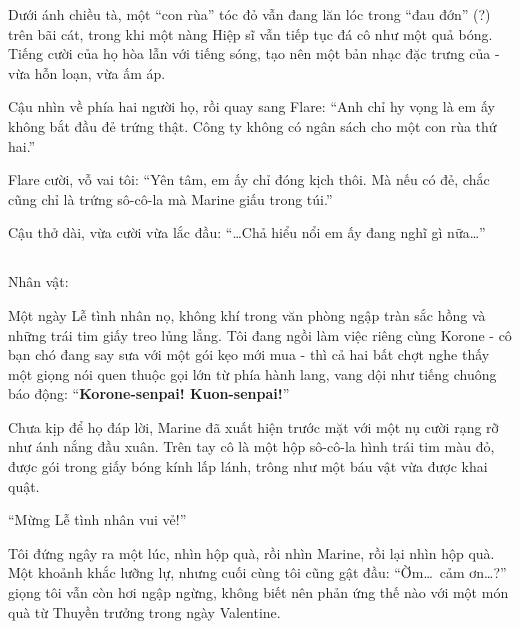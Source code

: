 \documentclass[../main.tex]{subfiles}
\begin{document}
Dưới ánh chiều tà, một ``con rùa'' tóc đỏ vẫn đang lăn lóc trong ``đau đớn'' (?) trên bãi cát, trong khi một nàng Hiệp sĩ vẫn tiếp tục đá cô như một quả bóng. Tiếng cười của họ hòa lẫn với tiếng sóng, tạo nên một bản nhạc đặc trưng của \hll - vừa hỗn loạn, vừa ấm áp.

Cậu nhìn về phía hai người họ, rồi quay sang Flare: ``Anh chỉ hy vọng là em ấy không bắt đầu đẻ trứng thật. Công ty không có ngân sách cho một con rùa thứ hai.''

Flare cười, vỗ vai tôi: ``Yên tâm, em ấy chỉ đóng kịch thôi. Mà nếu có đẻ, chắc cũng chỉ là trứng sô-cô-la mà Marine giấu trong túi.''

Cậu thở dài, vừa cười vừa lắc đầu: ``\dots Chả hiểu nổi em ấy đang nghĩ gì nữa\dots''

\newpage

\subsection*{\label{ep-S16.II}}
\vspace{-4pt}
\begin{center}
    {\caviar\fontsize{12pt}{12pt}\selectfont Nhân vật:      }
\end{center}


Một ngày Lễ tình nhân nọ, không khí trong văn phòng ngập tràn sắc hồng và những trái tim giấy treo lủng lẳng. Tôi đang ngồi làm việc riêng cùng Korone - cô bạn chó đang say sưa với một gói kẹo mới mua - thì cả hai bất chợt nghe thấy một giọng nói quen thuộc gọi lớn từ phía hành lang, vang dội như tiếng chuông báo động: ``\textbf{Korone-senpai! Kuon-senpai!}''

Chưa kịp để họ đáp lời, Marine đã xuất hiện trước mặt với một nụ cười rạng rỡ như ánh nắng đầu xuân. Trên tay cô là một hộp sô-cô-la hình trái tim màu đỏ, được gói trong giấy bóng kính lấp lánh, trông như một báu vật vừa được khai quật.

``Mừng Lễ tình nhân vui vẻ!''

Tôi đứng ngây ra một lúc, nhìn hộp quà, rồi nhìn Marine, rồi lại nhìn hộp quà. Một khoảnh khắc lưỡng lự, nhưng cuối cùng tôi cũng gật đầu: ``Ờm\dots\ cảm ơn\dots?'' giọng tôi vẫn còn hơi ngập ngừng, không biết nên phản ứng thế nào với một món quà từ Thuyền trưởng trong ngày Valentine.
\end{document}
